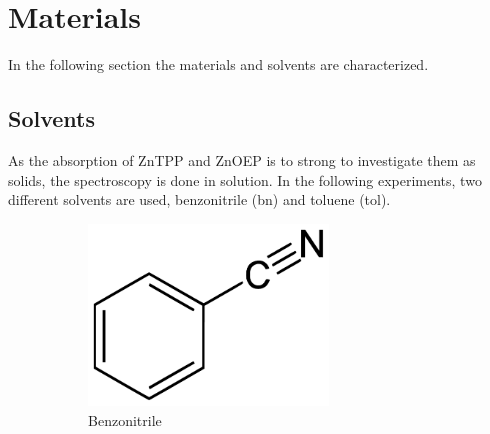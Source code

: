 \section{Materials}
\label{sec:materials}

In the following section the materials and solvents are characterized. 

\subsection{Solvents}

As the absorption of ZnTPP and ZnOEP is to strong to investigate them as solids, the spectroscopy is done in solution. In the following experiments, two different solvents are used, benzonitrile (bn) and toluene (tol). 

\begin{figure}[h]
    \centering
    \begin{subfigure}[b]{0.5\textwidth}
        \centering
        \includegraphics[width =0.7\textwidth]{Bilder/Grundlagen/Benzonitrile_structure.pdf}      
        \caption{Benzonitrile}
      \label{fig:BN}
    \end{subfigure}
    \hspace{\fill}
    \begin{subfigure}[b]{0.3\textwidth}
      \centering

\end{subfigure}
\end{figure}
